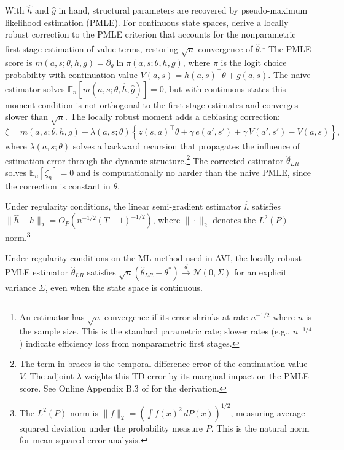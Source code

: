 With $\hat{h}$ and $\hat{g}$ in hand, structural parameters are recovered by pseudo-maximum likelihood estimation (PMLE). For continuous state spaces, \citet{AdusumilliEckardt2022} derive a locally robust correction to the PMLE criterion that accounts for the nonparametric first-stage estimation of value terms, restoring $\sqrt{n}$-convergence of $\hat{\theta}$.\footnote{An estimator has $\sqrt{n}$-convergence if its error shrinks at rate $n^{-1/2}$ where $n$ is the sample size. This is the standard parametric rate; slower rates (e.g., $n^{-1/4}$) indicate efficiency loss from nonparametric first stages.} The PMLE score is $m(a,s;\theta,h,g) = \partial_\theta \ln \pi(a,s;\theta,h,g)$, where $\pi$ is the logit choice probability with continuation value $V(a,s) = h(a,s)^\top \theta + g(a,s)$. The naive estimator solves $\mathbb{E}_n[m(a,s;\theta,\hat{h},\hat{g})] = 0$, but with continuous states this moment condition is not orthogonal to the first-stage estimates and converges slower than $\sqrt{n}$. The locally robust moment adds a debiasing correction:
\begin{equation}
\zeta = m(a,s;\theta,h,g) - \lambda(a,s;\theta)\left\{z(s,a)^\top \theta + \gamma \, e(a',s') + \gamma \, V(a',s') - V(a,s)\right\},
\label{eq:ae_robust}
\end{equation}
where $\lambda(a,s;\theta)$ solves a backward recursion that propagates the influence of estimation error through the dynamic structure.\footnote{The term in braces is the temporal-difference error of the continuation value $V$. The adjoint $\lambda$ weights this TD error by its marginal impact on the PMLE score. See Online Appendix B.3 of \citet{AdusumilliEckardt2022} for the derivation.} The corrected estimator $\hat{\theta}_{LR}$ solves $\mathbb{E}_n[\zeta_n] = 0$ and is computationally no harder than the naive PMLE, since the correction is constant in $\theta$.

\begin{theorem}
Under regularity conditions, the linear semi-gradient estimator $\hat{h}$ satisfies $\|\hat{h} - h\|_2 = O_P(n^{-1/2}(T-1)^{-1/2})$, where $\|\cdot\|_2$ denotes the $L^2(P)$ norm.\footnote{The $L^2(P)$ norm is $\|f\|_2 = (\int f(x)^2 \, dP(x))^{1/2}$, measuring average squared deviation under the probability measure $P$. This is the natural norm for mean-squared-error analysis.}
\end{theorem}

\begin{theorem}
Under regularity conditions on the ML method used in AVI, the locally robust PMLE estimator $\hat{\theta}_{LR}$ satisfies $\sqrt{n}(\hat{\theta}_{LR} - \theta^*) \xrightarrow{d} \mathcal{N}(0, \Sigma)$ for an explicit variance $\Sigma$, even when the state space is continuous.
\end{theorem}

